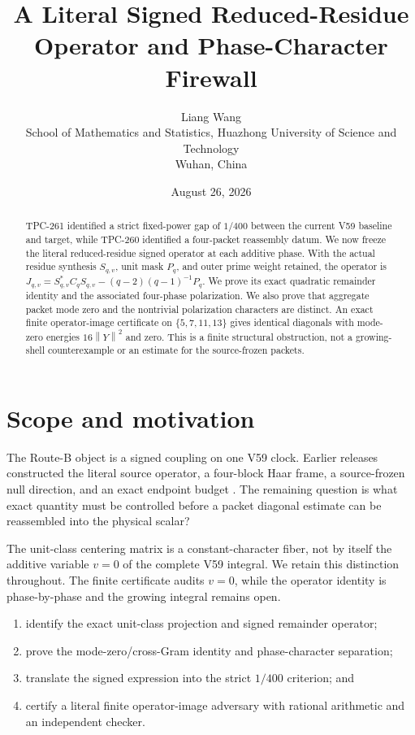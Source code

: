 \documentclass[11pt]{article}
\title{A Literal Signed Reduced-Residue Operator and Phase-Character Firewall}
\author{Liang Wang\\
School of Mathematics and Statistics, Huazhong University of Science and Technology\\
Wuhan, China}
\date{August 26, 2026}
\newcommand{\norm}[1]{\left\lVert #1\right\rVert}
\begin{document}
\maketitle
\begin{abstract}
TPC-261 identified a strict fixed-power gap of \(1/400\) between the current
V59 baseline and target, while TPC-260 identified a four-packet reassembly
datum.  We now freeze the literal reduced-residue signed operator at each
additive phase.  With the actual residue synthesis \(S_{q,v}\), unit mask
\(P_q\), and outer prime weight retained, the operator is
\(J_{q,v}=S_{q,v}^{*}C_qS_{q,v}-(q-2)(q-1)^{-1}P_q\).  We prove its exact
quadratic remainder identity and the associated four-phase polarization.
We also prove that aggregate packet mode zero and the nontrivial polarization
characters are distinct.  An exact finite operator-image certificate on
\(\{5,7,11,13\}\) gives identical diagonals with mode-zero energies
\(16\norm{Y}^2\) and zero.  This is a finite structural obstruction, not a
growing-shell counterexample or an estimate for the source-frozen packets.
\end{abstract}
\section{Scope and motivation}
The Route-B object is a signed coupling on one V59 clock.  Earlier releases
constructed the literal source operator, a four-block Haar frame, a
source-frozen null direction, and an exact endpoint budget
\cite{tpc247,tpc260,tpc261}.  The remaining question is what exact quantity
must be controlled before a packet diagonal estimate can be reassembled into
the physical scalar?

The unit-class centering matrix is a constant-character fiber, not by itself
the additive variable \(v=0\) of the complete V59 integral.  We retain this
distinction throughout.  The finite certificate audits \(v=0\), while the
operator identity is phase-by-phase and the growing integral remains open.

\begin{enumerate}
\item identify the exact unit-class projection and signed remainder operator;
\item prove the mode-zero/cross-Gram identity and phase-character separation;
\item translate the signed expression into the strict \(1/400\) criterion; and
\item certify a literal finite operator-image adversary with rational
      arithmetic and an independent checker.
\end{enumerate}
\end{document}
